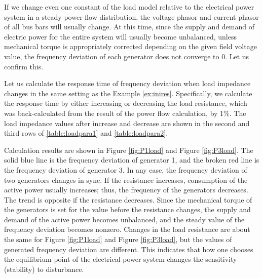 \documentclass[graybox, envcountchap]{svmult}
\begin{document}
If we change even one constant of the load model relative to the electrical power system in a steady power flow distribution, the voltage phasor and current phasor of all bus bars will usually change.
At this time, since the supply and demand of electric power for the entire system will usually become unbalanced, unless mechanical torque is appropriately corrected depending on the given field voltage value, the frequency deviation of each generator does not converge to 0.
Let us confirm this.

\begin{example}\label{ex:loadpv}
Let us calculate the response time of frequency deviation when load impedance changes in the same setting as the Example \ref{ex:inires}.
Specifically, we calculate the response time by either increasing or decreasing the load resistance, which was back-calculated from the result of the power flow calculation, by 1\%.
The load impedance values after increase and decrease are shown in the second and third rows of \ref{table:loadpara1} and \ref{table:loadpara2}.

Calculation results are shown in Figure \ref{fig:P1load} and Figure \ref{fig:P3load}.
The solid blue line is the frequency deviation of generator 1, and the broken red line is the frequency deviation of generator 3.
In any case, the frequency deviation of two generators changes in sync. If the resistance increases, consumption of the active power usually increases; thus, the frequency of the generators decreases.
The trend is opposite if the resistance decreases. Since the mechanical torque of the generators is set for the value before the resistance changes, the supply and demand of the active power becomes unbalanced, and the steady value of the frequency deviation becomes nonzero.
Changes in the load resistance are about the same for Figure \ref{fig:P1load} and Figure \ref{fig:P3load}, but the values of generated frequency deviation are different.
This indicates that how one chooses the equilibrium point of the electrical power system changes the sensitivity (stability) to disturbance.

\end{example}
\end{document}

